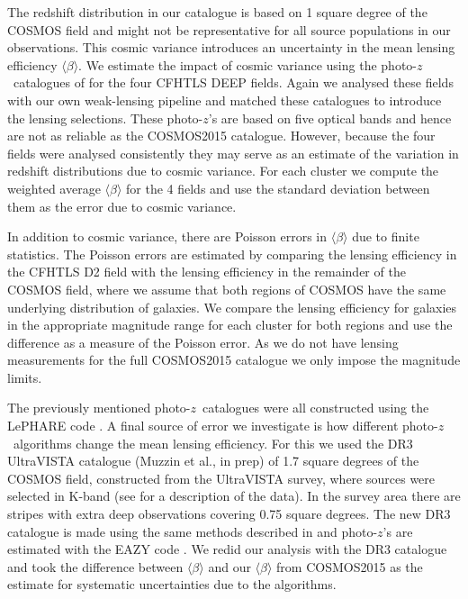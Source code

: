 \documentclass[useAMS,usenatbib]{mnras}
\newcommand{\pz}{photo-$z$}
\begin{document}
The redshift distribution in our catalogue is based on 1 square degree of the COSMOS field and might not be representative for all source populations in our observations. This cosmic variance introduces an uncertainty in the mean lensing efficiency $\langle \beta \rangle$. We estimate the impact of cosmic variance using the \pz \ catalogues of \citet{coupon09} for the four CFHTLS DEEP fields. Again we analysed these fields with our own weak-lensing pipeline and matched these catalogues to introduce the lensing selections. These \pz's are based on five optical bands and hence are not as reliable as the COSMOS2015 catalogue. However, because the four fields were analysed consistently they may serve as an estimate of the variation in redshift distributions due to cosmic variance. For each cluster we compute the weighted average $\langle \beta \rangle$ for the 4 fields and use the standard deviation between them as the error due to cosmic variance. 

In addition to cosmic variance, there are Poisson errors in $\langle \beta \rangle$ due to finite statistics. The Poisson errors are estimated by comparing the lensing efficiency in the CFHTLS D2 field with the lensing efficiency in the remainder of the COSMOS field, where we assume that both regions of COSMOS have the same underlying distribution of galaxies. We compare the lensing efficiency for galaxies in the appropriate magnitude range for each cluster for both regions and use the difference as a measure of the Poisson error. As we do not have lensing measurements for the full COSMOS2015 catalogue we only impose the magnitude limits. 


The previously mentioned \pz \ catalogues were all constructed using the LePHARE code \citep{ilbert06}. A final source of error we investigate is how different \pz \ algorithms change the mean lensing efficiency. For this we used the DR3 UltraVISTA catalogue (Muzzin et al., in prep) of 1.7 square degrees of the COSMOS field, constructed from the UltraVISTA survey, where sources were selected in K-band (see \citealt{hill17} for a description of the data). In the survey area there are stripes with extra deep observations covering 0.75 square degrees. The new DR3 catalogue is made using the same methods described in \citet{muzzin13} and \pz's are estimated with the EAZY code \citep{brammer08}. We redid our analysis with the DR3 catalogue and took the difference between $\langle \beta \rangle$ and our $\langle \beta \rangle$ from COSMOS2015 as the estimate for systematic uncertainties due to the algorithms. 
\end{document}
